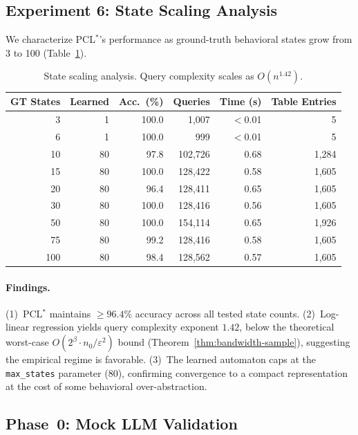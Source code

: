 \documentclass[11pt]{article}
\newcommand{\pclstar}{PCL$^*$}
\begin{document}
\subsection{Experiment 6: State Scaling Analysis}\label{sec:scaling}

We characterize \pclstar{}'s performance as ground-truth behavioral
states grow from 3 to 100 (Table~\ref{tab:scaling}).

\begin{table}[t]
\centering
\caption{State scaling analysis.  Query complexity scales as $O(n^{1.42})$.}
\label{tab:scaling}
\small
\begin{tabular}{@{}rrrrrr@{}}
\toprule
GT States & Learned & Acc.\ (\%) & Queries & Time (s) & Table Entries \\
\midrule
  3  &  1 & 100.0 &    1{,}007 & $<$0.01 &      5 \\
  6  &  1 & 100.0 &      999 & $<$0.01 &      5 \\
 10  & 80 &  97.8 &  102{,}726 &    0.68 &  1{,}284 \\
 15  & 80 & 100.0 &  128{,}422 &    0.58 &  1{,}605 \\
 20  & 80 &  96.4 &  128{,}411 &    0.65 &  1{,}605 \\
 30  & 80 & 100.0 &  128{,}416 &    0.56 &  1{,}605 \\
 50  & 80 & 100.0 &  154{,}114 &    0.65 &  1{,}926 \\
 75  & 80 &  99.2 &  128{,}416 &    0.58 &  1{,}605 \\
100  & 80 &  98.4 &  128{,}562 &    0.57 &  1{,}605 \\
\bottomrule
\end{tabular}
\end{table}

\paragraph{Findings.}
(1)~\pclstar{} maintains ${\ge}96.4\%$ accuracy across all tested
state counts.
(2)~Log-linear regression yields query complexity exponent $1.42$,
below the theoretical worst-case $O(2^\beta \cdot n_0 / \varepsilon^2)$
bound (Theorem~\ref{thm:bandwidth-sample}), suggesting the empirical
regime is favorable.
(3)~The learned automaton caps at the \texttt{max\_states} parameter
(80), confirming convergence to a compact representation at the cost
of some behavioral over-abstraction.

\subsection{Phase~0: Mock LLM Validation}\label{sec:phase0}
\end{document}
